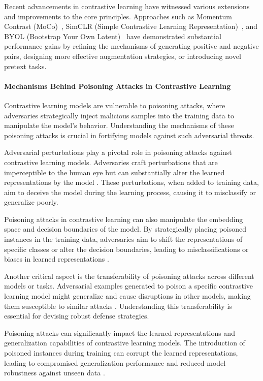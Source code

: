 \begin{enumerate}
Recent advancements in contrastive learning have witnessed various extensions and improvements to the core principles. Approaches such as Momentum Contrast (MoCo)~\cite{he2020momentum}, SimCLR (Simple Contrastive Learning Representation)~\cite{chen2020simple}, and BYOL (Bootstrap Your Own Latent)~\cite{grill2020bootstrap} have demonstrated substantial performance gains by refining the mechanisms of generating positive and negative pairs, designing more effective augmentation strategies, or introducing novel pretext tasks.



\paragraph{Mechanisms Behind Poisoning Attacks in Contrastive Learning}

Contrastive learning models are vulnerable to poisoning attacks, where adversaries strategically inject malicious samples into the training data to manipulate the model's behavior. Understanding the mechanisms of these poisoning attacks is crucial in fortifying models against such adversarial threats.

Adversarial perturbations play a pivotal role in poisoning attacks against contrastive learning models. Adversaries craft perturbations that are imperceptible to the human eye but can substantially alter the learned representations by the model \cite{goodfellow2014explaining}. These perturbations, when added to training data, aim to deceive the model during the learning process, causing it to misclassify or generalize poorly.

Poisoning attacks in contrastive learning can also manipulate the embedding space and decision boundaries of the model. By strategically placing poisoned instances in the training data, adversaries aim to shift the representations of specific classes or alter the decision boundaries, leading to misclassifications or biases in learned representations \cite{kim2020adversarial}.

Another critical aspect is the transferability of poisoning attacks across different models or tasks. Adversarial examples generated to poison a specific contrastive learning model might generalize and cause disruptions in other models, making them susceptible to similar attacks \cite{papernot2016transferability}. Understanding this transferability is essential for devising robust defense strategies.

Poisoning attacks can significantly impact the learned representations and generalization capabilities of contrastive learning models. The introduction of poisoned instances during training can corrupt the learned representations, leading to compromised generalization performance and reduced model robustness against unseen data \cite{munoz2017towards}.


\end{enumerate}
